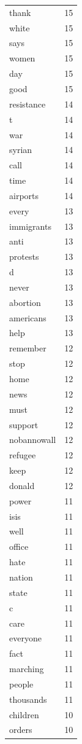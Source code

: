 \begin{tabular}{lr}
thank & 15 \\
white & 15 \\
says & 15 \\
women & 15 \\
day & 15 \\
good & 15 \\
resistance & 14 \\
t & 14 \\
war & 14 \\
syrian & 14 \\
call & 14 \\
time & 14 \\
airports & 14 \\
every & 13 \\
immigrants & 13 \\
anti & 13 \\
protests & 13 \\
d & 13 \\
never & 13 \\
abortion & 13 \\
americans & 13 \\
help & 13 \\
remember & 12 \\
stop & 12 \\
home & 12 \\
news & 12 \\
must & 12 \\
support & 12 \\
nobannowall & 12 \\
refugee & 12 \\
keep & 12 \\
donald & 12 \\
power & 11 \\
isis & 11 \\
well & 11 \\
office & 11 \\
hate & 11 \\
nation & 11 \\
state & 11 \\
c & 11 \\
care & 11 \\
everyone & 11 \\
fact & 11 \\
marching & 11 \\
people & 11 \\
thousands & 11 \\
children & 10 \\
orders & 10 \\

\end{tabular}
